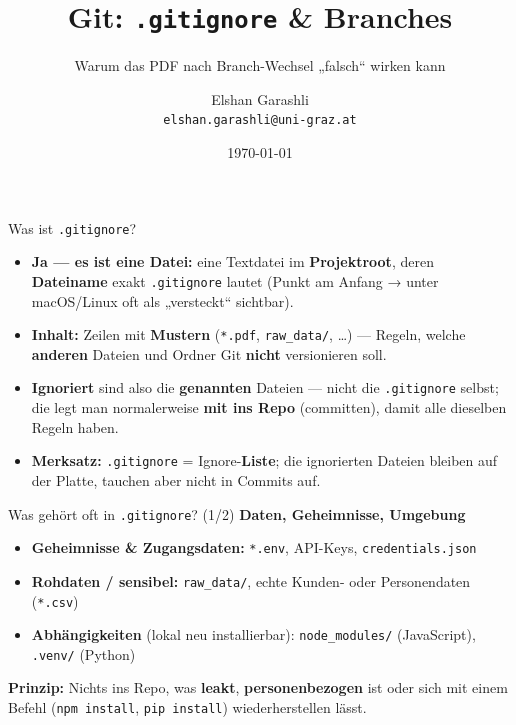 \documentclass{beamer}
\title{Git: \texttt{.gitignore} \& Branches}
\subtitle{Warum das PDF nach Branch-Wechsel „falsch“ wirken kann}
\author{\texorpdfstring{Elshan Garashli\\\texttt{elshan.garashli@uni-graz.at}}{Elshan Garashli}}
\institute{Universität Graz}
\date{\today}
\begin{document}
\begingroup
{}
\frame{\titlepage}
\endgroup

\begin{frame}{Was ist \texttt{.gitignore}?}
\begin{itemize}
\item \textbf{Ja — es ist eine Datei:} eine Textdatei im \textbf{Projektroot}, deren \textbf{Dateiname} exakt \texttt{.gitignore} lautet (Punkt am Anfang → unter macOS/Linux oft als „versteckt“ sichtbar).
\item \textbf{Inhalt:} Zeilen mit \textbf{Mustern} (\texttt{*.pdf}, \texttt{raw\_data/}, \ldots) — Regeln, welche \textbf{anderen} Dateien und Ordner Git \textbf{nicht} versionieren soll.
\item \textbf{Ignoriert} sind also die \textbf{genannten} Dateien — nicht die \texttt{.gitignore} selbst; die legt man normalerweise \textbf{mit ins Repo} (committen), damit alle dieselben Regeln haben.
\item \textbf{Merksatz:} \texttt{.gitignore} = Ignore-\textbf{Liste}; die ignorierten Dateien bleiben auf der Platte, tauchen aber nicht in Commits auf.
\end{itemize}
\end{frame}

\begin{frame}{Was gehört oft in \texttt{.gitignore}? (1/2)}
\textbf{Daten, Geheimnisse, Umgebung}
\begin{itemize}
\item \textbf{Geheimnisse \& Zugangsdaten:} \texttt{*.env}, API-Keys, \texttt{credentials.json}
\item \textbf{Rohdaten / sensibel:} \texttt{raw\_data/}, echte Kunden- oder Personendaten (\texttt{*.csv})
\item \textbf{Abhängigkeiten} (lokal neu installierbar): \texttt{node\_modules/} (JavaScript), \texttt{.venv/} (Python)
\end{itemize}
\vspace{0.5em}
\textbf{Prinzip:} Nichts ins Repo, was \textbf{leakt}, \textbf{personenbezogen} ist oder sich mit einem Befehl (\texttt{npm install}, \texttt{pip install}) wiederherstellen lässt.
\end{frame}
\end{document}
